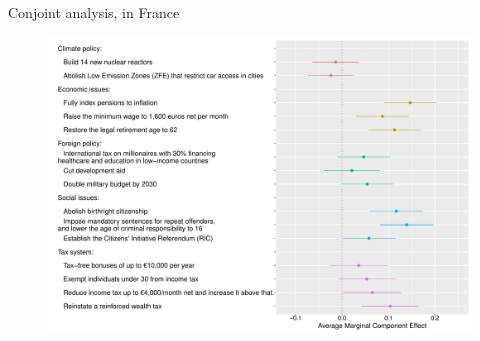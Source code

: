 \documentclass[aspectratio=169,xcolor=dvipsnames, 11pt,mathserif]{beamer}
\begin{document}

\begin{frame}{Conjoint analysis,  in France\label{conjoint_countries} \hyperlink{conjoint_country}{}} 
    \begin{figure} \vspace{-.14cm}
\includegraphics[height=.97\textheight]{../figures/all/conjoint_EN-FR.pdf}
\end{figure}
\end{frame}
\end{document}
